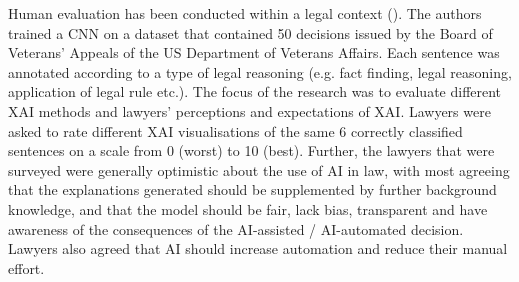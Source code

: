 \begin{table}[!ht]
	\caption{Methods of measuring human evaluation of XAI (\cite{doshi-velez2017}).}
	\label{tab:human_eval_xai}
\end{table}

Human evaluation has been conducted within a legal context (\cite{gorski2021}). The authors trained a CNN on a dataset that contained 50 decisions issued by the Board of Veterans' Appeals of the US Department of Veterans Affairs. Each sentence was annotated according to a type of legal reasoning (e.g. fact finding, legal reasoning, application of legal rule etc.). The focus of the research was to evaluate different XAI methods and lawyers' perceptions and expectations of XAI. Lawyers were asked to rate different XAI visualisations of the same 6 correctly classified sentences on a scale from 0 (worst) to 10 (best). Further, the lawyers that were surveyed were generally optimistic about the use of AI in law, with most agreeing that the explanations generated should be supplemented by further background knowledge, and that the model should be fair, lack bias, transparent and have awareness of the consequences of the AI-assisted / AI-automated decision. Lawyers also agreed that AI should increase automation and reduce their manual effort. 

